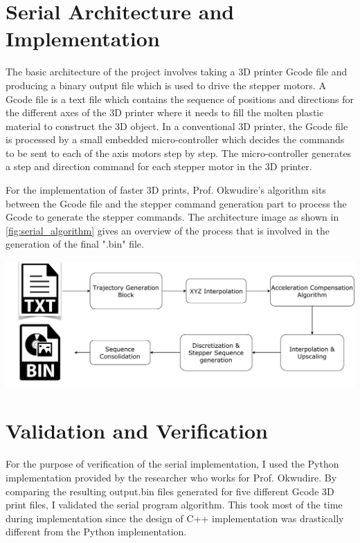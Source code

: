 \documentclass[12pt,letterpaper]{article}
\begin{document}
\section{Serial Architecture and Implementation}
The basic architecture of the project involves taking a 3D printer Gcode file and producing a binary output file which is used to drive the stepper motors. A Gcode file is a text file which contains the sequence of positions and directions for the different axes of the 3D printer where it needs to fill the molten plastic material to construct the 3D object. In a conventional 3D printer, the Gcode file is processed by a small embedded micro-controller which decides the commands to be sent to each of the axis motors step by step. The micro-controller generates a step and direction command for each stepper motor in the 3D printer.

For the implementation of faster 3D prints, Prof. Okwudire's algorithm sits between the Gcode file and the stepper command generation part to process the Gcode to generate the stepper commands. The architecture image as shown in \ref{fig:serial_algorithm} gives an overview of the process that is involved in the generation of the final ".bin" file. 

\begin{center}
   \includegraphics[scale=0.45]{images/serial-program.pdf}
   \label{fig:serial_algorithm}
\end{center}

\section{Validation and Verification}
For the purpose of verification of the serial implementation, I used the Python implementation provided by the researcher who works for Prof. Okwudire. By comparing the resulting output.bin files generated for five different Gcode 3D print files, I validated the serial program algorithm. This took most of the time during implementation since the design of C++ implementation was drastically different from the Python implementation.
\end{document}
